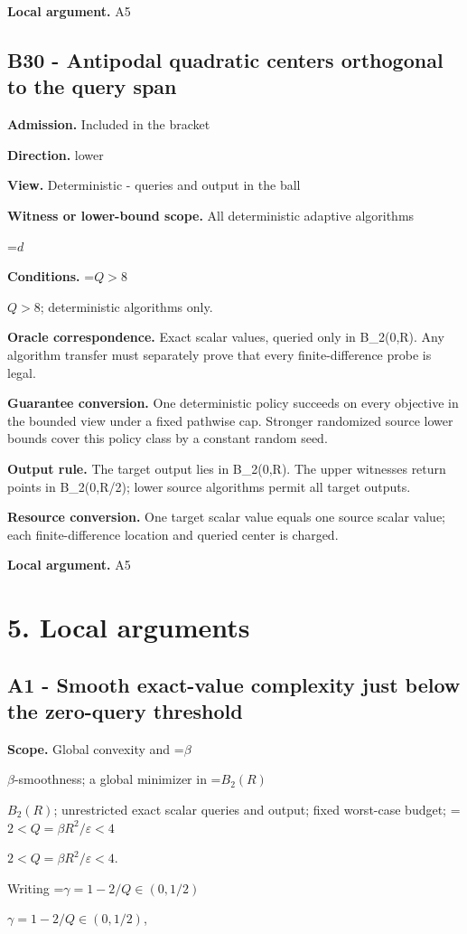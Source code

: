 \documentclass[10pt,a4paper]{article}
\newcommand{\AtlasMath}[1]{\par\begingroup\centering\setbox0=\hbox{$\displaystyle #1$}\ifdim\wd0>1.4\linewidth\typeout{ATLAS WIDE FORMULA: \the\wd0}\fi\ifdim\wd0>\linewidth\resizebox{\linewidth}{!}{\box0}\else\box0\fi\par\endgroup}
\newcommand{\AtlasInlineMath}[1]{\begingroup\setbox0=\hbox{$#1$}\ifdim\wd0>.4\linewidth\endgroup\AtlasMath{#1}\else\endgroup$#1$\fi}
\begin{document}
\textbf{Local argument.} A5

\subsection{B30 - Antipodal quadratic centers orthogonal to the query span}
\textbf{Admission.} Included in the bracket

\textbf{Direction.} lower

\textbf{View.} Deterministic - queries and output in the ball

\textbf{Witness or lower-bound scope.} All deterministic adaptive algorithms

\AtlasMath{d}
\textbf{Conditions.} \AtlasInlineMath{Q>8}; deterministic algorithms only.

\textbf{Oracle correspondence.} Exact scalar values, queried only in B\_2(0,R). Any algorithm transfer must separately prove that every finite-difference probe is legal.

\textbf{Guarantee conversion.} One deterministic policy succeeds on every objective in the bounded view under a fixed pathwise cap. Stronger randomized source lower bounds cover this policy class by a constant random seed.

\textbf{Output rule.} The target output lies in B\_2(0,R). The upper witnesses return points in B\_2(0,R/2); lower source algorithms permit all target outputs.

\textbf{Resource conversion.} One target scalar value equals one source scalar value; each finite-difference location and queried center is charged.

\textbf{Local argument.} A5

\section{5. Local arguments}
\subsection{A1 - Smooth exact-value complexity just below the zero-query threshold}
\textbf{Scope.} Global convexity and \AtlasInlineMath{\beta}-smoothness; a global minimizer in \AtlasInlineMath{B_2(R)}; unrestricted exact scalar queries and output; fixed worst-case budget; \AtlasInlineMath{2<Q=\beta R^2/\varepsilon<4}.

Writing \AtlasInlineMath{\gamma=1-2/Q\in(0,1/2)},
\end{document}
